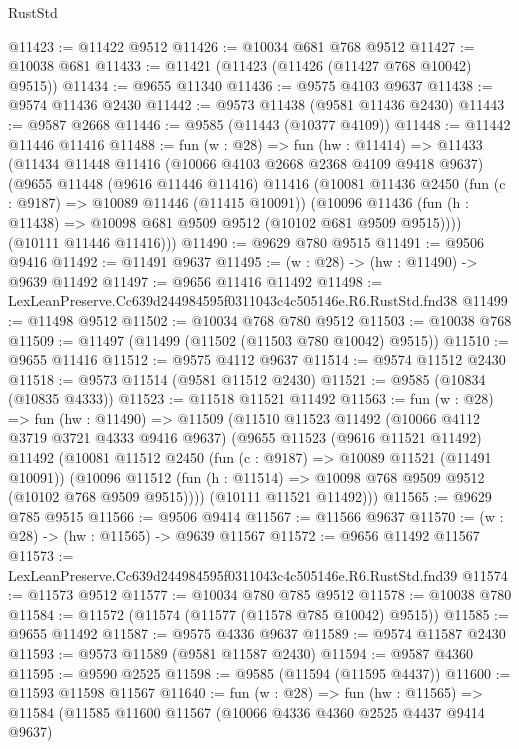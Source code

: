 \begin{lexlean}{RustStd}
\begin{coremodule}
@11423 := @11422 @9512
@11426 := @10034 @681 @768 @9512
@11427 := @10038 @681
@11433 := @11421 (@11423 (@11426 (@11427 @768 @10042) @9515))
@11434 := @9655 @11340
@11436 := @9575 @4103 @9637
@11438 := @9574 @11436 @2430
@11442 := @9573 @11438 (@9581 @11436 @2430)
@11443 := @9587 @2668
@11446 := @9585 (@11443 (@10377 @4109))
@11448 := @11442 @11446 @11416
@11488 := fun (w : @28) =>
  fun (hw : @11414) =>
  @11433
    (@11434
      @11448
      @11416
      (@10066 @4103 @2668 @2368 @4109 @9418 @9637)
      (@9655
        @11448
        (@9616 @11446 @11416)
        @11416
        (@10081
          @11436
          @2450
          (fun (c : @9187) => @10089 @11446 (@11415 @10091))
          (@10096 @11436 (fun (h : @11438) => @10098 @681 @9509 @9512 (@10102 @681 @9509 @9515))))
        (@10111 @11446 @11416)))
@11490 := @9629 @780 @9515
@11491 := @9506 @9416
@11492 := @11491 @9637
@11495 := (w : @28) -> (hw : @11490) -> @9639 @11492
@11497 := @9656 @11416 @11492
@11498 := LexLeanPreserve.Cc639d244984595f0311043c4c505146e.R6.RustStd.fnd38
@11499 := @11498 @9512
@11502 := @10034 @768 @780 @9512
@11503 := @10038 @768
@11509 := @11497 (@11499 (@11502 (@11503 @780 @10042) @9515))
@11510 := @9655 @11416
@11512 := @9575 @4112 @9637
@11514 := @9574 @11512 @2430
@11518 := @9573 @11514 (@9581 @11512 @2430)
@11521 := @9585 (@10834 (@10835 @4333))
@11523 := @11518 @11521 @11492
@11563 := fun (w : @28) =>
  fun (hw : @11490) =>
  @11509
    (@11510
      @11523
      @11492
      (@10066 @4112 @3719 @3721 @4333 @9416 @9637)
      (@9655
        @11523
        (@9616 @11521 @11492)
        @11492
        (@10081
          @11512
          @2450
          (fun (c : @9187) => @10089 @11521 (@11491 @10091))
          (@10096 @11512 (fun (h : @11514) => @10098 @768 @9509 @9512 (@10102 @768 @9509 @9515))))
        (@10111 @11521 @11492)))
@11565 := @9629 @785 @9515
@11566 := @9506 @9414
@11567 := @11566 @9637
@11570 := (w : @28) -> (hw : @11565) -> @9639 @11567
@11572 := @9656 @11492 @11567
@11573 := LexLeanPreserve.Cc639d244984595f0311043c4c505146e.R6.RustStd.fnd39
@11574 := @11573 @9512
@11577 := @10034 @780 @785 @9512
@11578 := @10038 @780
@11584 := @11572 (@11574 (@11577 (@11578 @785 @10042) @9515))
@11585 := @9655 @11492
@11587 := @9575 @4336 @9637
@11589 := @9574 @11587 @2430
@11593 := @9573 @11589 (@9581 @11587 @2430)
@11594 := @9587 @4360
@11595 := @9590 @2525
@11598 := @9585 (@11594 (@11595 @4437))
@11600 := @11593 @11598 @11567
@11640 := fun (w : @28) =>
  fun (hw : @11565) =>
  @11584
    (@11585
      @11600
      @11567
      (@10066 @4336 @4360 @2525 @4437 @9414 @9637)

\end{coremodule}
\end{lexlean}
